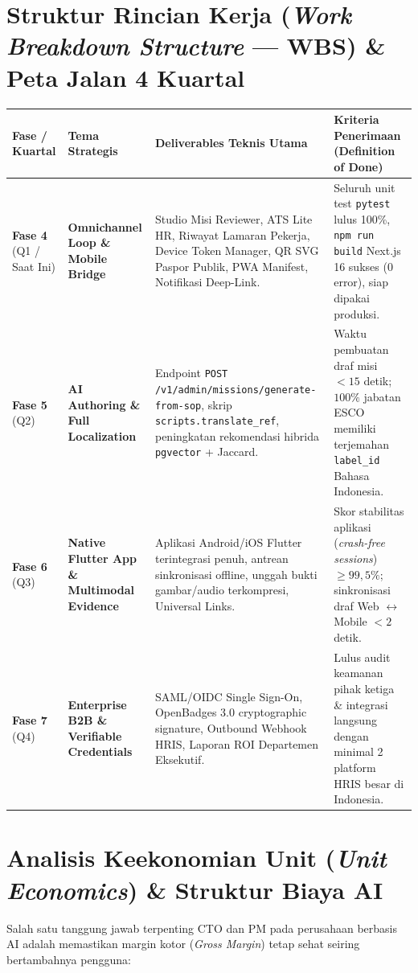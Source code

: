 \documentclass[11pt,a4paper]{report}
\begin{document}
\section{Struktur Rincian Kerja (\textit{Work Breakdown Structure} --- WBS) \& Peta Jalan 4 Kuartal}

\begin{tabularx}{\textwidth}{C{1.8cm} L{3.8cm} L{4.2cm} X}
\toprule
\textbf{Fase / Kuartal} & \textbf{Tema Strategis} & \textbf{Deliverables Teknis Utama} & \textbf{Kriteria Penerimaan (Definition of Done)} \\
\midrule
\textbf{Fase 4} \newline (Q1 / Saat Ini) & \textbf{Omnichannel Loop \& Mobile Bridge} & Studio Misi Reviewer, ATS Lite HR, Riwayat Lamaran Pekerja, Device Token Manager, QR SVG Paspor Publik, PWA Manifest, Notifikasi Deep-Link. & Seluruh unit test \texttt{pytest} lulus 100\%, \texttt{npm run build} Next.js 16 sukses (0 error), siap dipakai produksi. \\
\textbf{Fase 5} \newline (Q2) & \textbf{AI Authoring \& Full Localization} & Endpoint \texttt{POST /v1/admin/missions/generate-from-sop}, skrip \texttt{scripts.translate\_ref}, peningkatan rekomendasi hibrida \texttt{pgvector} + Jaccard. & Waktu pembuatan draf misi $< 15$ detik; $100\%$ jabatan ESCO memiliki terjemahan \texttt{label\_id} Bahasa Indonesia. \\
\textbf{Fase 6} \newline (Q3) & \textbf{Native Flutter App \& Multimodal Evidence} & Aplikasi Android/iOS Flutter terintegrasi penuh, antrean sinkronisasi offline, unggah bukti gambar/audio terkompresi, Universal Links. & Skor stabilitas aplikasi (\textit{crash-free sessions}) $\ge 99{,}5\%$; sinkronisasi draf Web $\leftrightarrow$ Mobile $< 2$ detik. \\
\textbf{Fase 7} \newline (Q4) & \textbf{Enterprise B2B \& Verifiable Credentials} & SAML/OIDC Single Sign-On, OpenBadges 3.0 cryptographic signature, Outbound Webhook HRIS, Laporan ROI Departemen Eksekutif. & Lulus audit keamanan pihak ketiga \& integrasi langsung dengan minimal 2 platform HRIS besar di Indonesia. \\
\bottomrule
\end{tabularx}

\section{Analisis Keekonomian Unit (\textit{Unit Economics}) \& Struktur Biaya AI}
Salah satu tanggung jawab terpenting CTO dan PM pada perusahaan berbasis AI adalah memastikan margin kotor (\textit{Gross Margin}) tetap sehat seiring bertambahnya pengguna:
\end{document}
